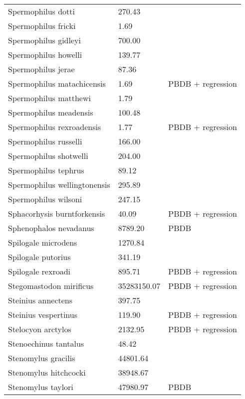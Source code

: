 \documentclass{article}
\begin{document}
\begin{center}
\begin{longtable}{p{} p{} p{}}
    Spermophilus dotti & 270.43 & \cite{Tomiya2013} \\ 
    Spermophilus fricki & 1.69 & \cite{Simons1960} \\ 
    Spermophilus gidleyi & 700.00 & \cite{McKenna2011} \\ 
    Spermophilus howelli & 139.77 & \cite{Tomiya2013} \\ 
    Spermophilus jerae & 87.36 & \cite{Tomiya2013} \\ 
    Spermophilus matachicensis & 1.69 & PBDB + regression \\ 
    Spermophilus matthewi & 1.79 & \cite{Beatty2009} \\ 
    Spermophilus meadensis & 100.48 & \cite{Tomiya2013} \\ 
    Spermophilus rexroadensis & 1.77 & PBDB + regression \\ 
    Spermophilus russelli & 166.00 & \cite{McKenna2011} \\ 
    Spermophilus shotwelli & 204.00 & \cite{McKenna2011} \\ 
    Spermophilus tephrus & 89.12 & \cite{Tomiya2013} \\ 
    Spermophilus wellingtonensis & 295.89 & \cite{Tomiya2013} \\ 
    Spermophilus wilsoni & 247.15 & \cite{Tomiya2013} \\ 
    Sphacorhysis burntforkensis & 40.09 & PBDB + regression \\ 
    Sphenophalos nevadanus & 8789.20 & PBDB \\ 
    Spilogale microdens & 1270.84 & \cite{Chester2012} \\ 
    Spilogale putorius & 341.19 & \cite{Smith2004} \\ 
    Spilogale rexroadi & 895.71 & PBDB + regression \\ 
    Stegomastodon mirificus & 35283150.07 & PBDB + regression \\ 
    Steinius annectens & 397.75 & \cite{Strait2001} \\ 
    Steinius vespertinus & 119.90 & PBDB + regression \\ 
    Stelocyon arctylos & 2132.95 & PBDB + regression \\ 
    Stenoechinus tantalus & 48.42 & \cite{Tomiya2013} \\ 
    Stenomylus gracilis & 44801.64 & \cite{Tomiya2013} \\ 
    Stenomylus hitchcocki & 38948.67 & \cite{Tomiya2013} \\ 
    Stenomylus taylori & 47980.97 & PBDB \\ 

\end{longtable}
\end{center}
\end{document}

